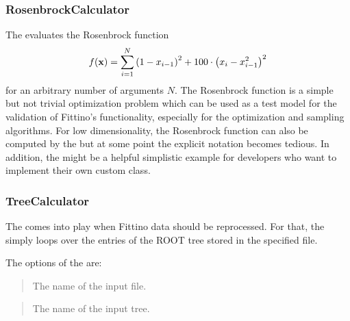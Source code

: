 \documentclass[letterpaper,10pt,english]{sphinxmanual}
\begin{document}
\begin{quote}


\end{quote}


\subsubsection{RosenbrockCalculator}
\label{rosenbrock_calculator:rosenbrockcalculator}\label{rosenbrock_calculator::doc}
The  evaluates the Rosenbrock function
\begin{gather}
\begin{split}f(\mathbf{x})=\sum_{i=1}^{N}\left(1-x_{i-1}\right)^2+100\cdot\left(x_{i}-x_{i-1}^2\right)^2\end{split}\notag
\end{gather}
for an arbitrary number of arguments \(N\). The Rosenbrock function is a simple but not trivial
optimization problem which can be used as a test model for the validation of Fittino's
functionality, especially for the optimization and sampling algorithms. For low dimensionality, the
Rosenbrock function can also be computed by the  but at some point the explicit
notation becomes tedious. In addition, the  might be a helpful simplistic
example for developers who want to implement their own custom  class.


\subsubsection{TreeCalculator}
\label{tree_calculator::doc}\label{tree_calculator:treecalculator}
The  comes into play when Fittino data should be reprocessed. For that, the
 simply loops over the entries of the ROOT tree stored in the specified file.

The options of the  are:

\begin{quote}

The name of the input file.
\end{quote}

\begin{quote}

The name of the input tree.
\end{quote}
\end{document}
